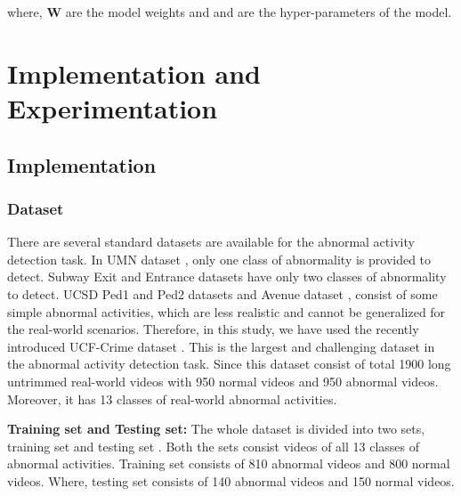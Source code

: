 \documentclass[conference]{IEEEtran}
\begin{document}
where, \textbf{W} are the model weights and  and  are the hyper-parameters of the model.
  
 
\section{Implementation and Experimentation} \label{IE}

\subsection{Implementation} \label{Impl}
\subsubsection{Dataset} \label{dataset}
There are several standard datasets \cite{A7, A10, A8, A9, A6} are available for the abnormal activity detection task. In UMN dataset \cite{A7}, only one class of abnormality is provided to detect. Subway Exit and Entrance datasets \cite{A10} have only two classes of abnormality to detect. UCSD Ped1 and Ped2 datasets \cite{A8} and Avenue dataset \cite{A9}, consist of some simple abnormal activities, which are less realistic and cannot be generalized for the real-world scenarios. Therefore, in this study, we have used the recently introduced UCF-Crime dataset \cite{A6}. This is the largest and challenging dataset in the abnormal activity detection task. Since this dataset consist of total 1900 long untrimmed real-world videos with 950 normal videos and 950 abnormal videos. Moreover, it has 13 classes of real-world abnormal activities.  

\textbf{Training set and Testing set:} The whole dataset is divided into two sets, training set and testing set \cite{A6}. Both the sets consist videos of all 13 classes of abnormal activities. Training set consists of 810 abnormal videos and 800 normal videos. Where, testing set consists of 140 abnormal videos and 150 normal videos. 
\end{document}
